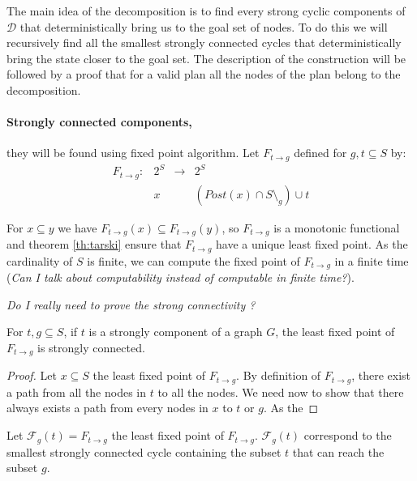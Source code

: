 The main idea of the decomposition is to find every strong cyclic components of $\mathcal{D}$ that deterministically bring us to the goal set of nodes.
To do this we will recursively find all the smallest strongly connected cycles that deterministically bring the state closer to the goal set.
The description of the construction will be followed by a proof that for a valid plan  all the nodes of the plan belong to the decomposition.

\paragraph{Strongly connected components,} they will be found using fixed point algorithm.
Let $F_{t \rightarrow g}$ defined for $g,t \subseteq S$ by:
\begin{equation}
\begin{array}{llll}
F_{t \rightarrow g} :& 2^S & \rightarrow & 2^S\\
 & x &  & (Post(x) \cap S \setminus_g) \cup t
\end{array}
\end{equation}


For $x \subseteq y$ we have $F_{t \rightarrow g} (x) \subseteq F_{t \rightarrow g}(y)$, so $F_{t \rightarrow g}$ is a monotonic functional and theorem \ref{th:tarski} ensure that $F_{t \rightarrow g}$ have a unique least fixed point.
As the cardinality of $S$ is finite, we can compute the fixed point of $F_{t \rightarrow g}$ in a finite time
(\textit{Can I talk about computability instead of computable in finite time?}).

\textit{Do I really need to prove the strong connectivity ?}
\begin{prop}
For $t,g \subseteq S$, if $t$ is a strongly component of a graph $G$, the least fixed point of $F_{t \rightarrow g}$ is strongly connected.
\end{prop}

\begin{proof} 
Let $x \subseteq S$ the least fixed point of $F_{t \rightarrow g}$.
By definition of $F_{t \rightarrow g}$, there exist a path from all the nodes in $t$ to all the nodes.
We need now to show that there always exists a path from every nodes in $x$ to $t$ or $g$.
As the 
\end{proof}

Let $\mathcal{F}_g(t) = F_{t \rightarrow g}$ the least fixed point of $F_{t \rightarrow g}$.
$\mathcal{F}_g(t)$ correspond to the smallest strongly connected cycle containing the subset $t$ that can reach the subset $g$.

